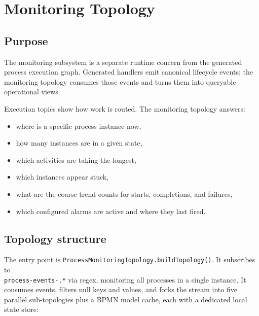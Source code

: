 \section{Monitoring Topology}
\label{sec:MonitoringTopology}

\subsection{Purpose}

The monitoring subsystem is a separate runtime concern from the generated process
execution graph. Generated handlers emit canonical lifecycle events; the monitoring
topology consumes those events and turns them into queryable operational views.

Execution topics show how work is routed. The monitoring topology answers:
\begin{itemize}
\item where is a specific process instance now,
\item how many instances are in a given state,
\item which activities are taking the longest,
\item which instances appear stuck,
\item what are the coarse trend counts for starts, completions, and failures,
\item which configured alarms are active and where they last fired.
\end{itemize}

\subsection{Topology structure}

The entry point is \texttt{ProcessMonitoringTopology.buildTopology()}. It
subscribes to \\ \texttt{process-events-.*} via regex, monitoring all processes
in a single instance.
It consumes events, filters null keys and values, and forks the stream into
five parallel sub-topologies plus a BPMN model cache, each with a dedicated
local state store:

